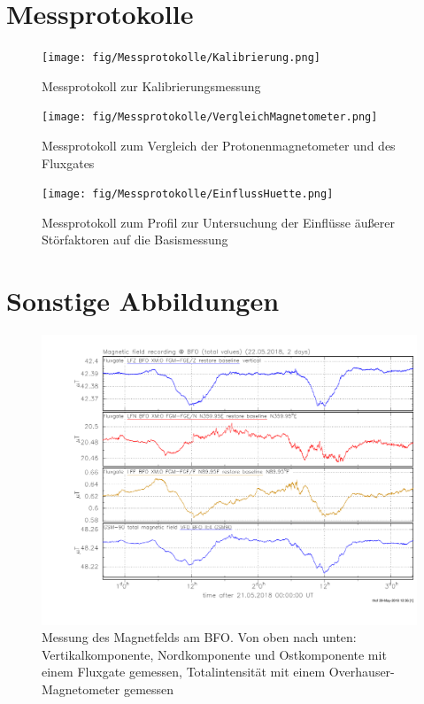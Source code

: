 \section{Messprotokolle}

\begin{figure}[!ht]
 \centering
 \texttt{[image: fig/Messprotokolle/Kalibrierung.png]}
 \caption{Messprotokoll zur Kalibrierungsmessung}
 \label{fig:MPKalibrierung}
\end{figure}

\begin{figure}[!ht]
 \centering
 \texttt{[image: fig/Messprotokolle/VergleichMagnetometer.png]}
 \caption{Messprotokoll zum Vergleich der Protonenmagnetometer und des Fluxgates}
 \label{fig:MPVergleich}
\end{figure}

\begin{figure}[!ht]
 \centering
 \texttt{[image: fig/Messprotokolle/EinflussHuette.png]}
 \caption{Messprotokoll zum Profil zur Untersuchung der Einflüsse äußerer Störfaktoren auf die Basismessung}
 \label{fig:MPHuette}
\end{figure}

\FloatBarrier
\section{Sonstige Abbildungen} %

\begin{figure}[!ht]
 \centering
 \includegraphics[width=\textwidth]{fig/Magnetfeld_BFO_2_Tage.pdf}
 \caption[Messung des Magnetfelds am BFO]{Messung des Magnetfelds am BFO. Von oben nach unten: Vertikalkomponente, Nordkomponente und Ostkomponente mit einem Fluxgate gemessen, Totalintensität mit einem Overhauser-Magnetometer gemessen}
 \label{fig:BFO}
\end{figure}

